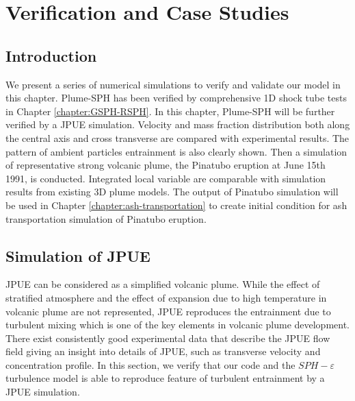\chapter{Verification and Case Studies} \label{chapter:case-studies}

\section{Introduction}
We present a series of numerical simulations to verify and validate our model in this chapter. Plume-SPH has been verified by comprehensive 1D shock tube tests in Chapter \ref{chapter:GSPH-RSPH}. In this chapter, Plume-SPH will be further verified by a JPUE simulation. Velocity and mass fraction distribution both along the central axis and cross transverse are compared with experimental results. The pattern of ambient particles entrainment is also clearly shown. Then a simulation of representative strong volcanic plume, the Pinatubo eruption at June 15th 1991, is conducted. Integrated local variable are comparable with simulation results from existing 3D plume models.
The output of Pinatubo simulation will be used in Chapter \ref{chapter:ash-transportation} to create initial condition for ash transportation simulation of Pinatubo eruption.

\section{Simulation of JPUE}
JPUE can be considered as a simplified volcanic plume. While the effect of stratified atmosphere and the effect of expansion due to high temperature in volcanic plume are not represented, JPUE reproduces the entrainment due to turbulent mixing which is one of the key elements in volcanic plume development. There exist consistently good experimental data \citep { list1982turbulent,dimotakis1983structure, papanicolaou1988investigations, ezzamel2015dynamical} that describe the JPUE flow field giving an insight into details of JPUE, such as transverse velocity and concentration profile. In this section, we verify that our code and the $SPH-\varepsilon$ turbulence model is able to reproduce feature of turbulent entrainment by a JPUE simulation.

